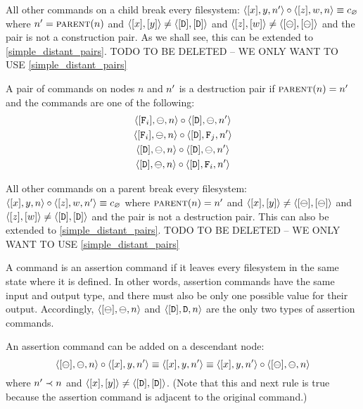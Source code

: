 \begin{myax}
All other commands on a child break every filesystem:
$\langle{[x],y,n'}\rangle\circ\langle{[z],w,n}\rangle \equiv c_\varnothing$ where $n'=\text{\normalfont\scshape{parent}}(n)$ and $\langle{[x],[y]}\rangle\neq\langle{[\mathtt{D}],[\mathtt{D}]}\rangle$ and $\langle{[z],[w]}\rangle\neq\langle{[\ominus],[\ominus]}\rangle$
and the pair is not a construction pair.
As we shall see, this can be extended to \cref{simple_distant_pairs}.
TODO TO BE DELETED -- WE ONLY WANT TO USE \cref{simple_distant_pairs}
\end{myax}

\begin{mydef}
A pair of commands on nodes $n$ and $n'$ is a destruction pair if $\text{\normalfont\scshape{parent}}(n)=n'$ and the commands are one
of the following:
   \begin{gather*}
            \langle{[\mathtt{F}_i],\ominus,n}\rangle\circ  \langle{[\mathtt{D}],\ominus,n'}\rangle \\
            \langle{[\mathtt{F}_i],\ominus,n}\rangle\circ  \langle{[\mathtt{D}],\mathtt{F}_j,n'}\rangle \\
            \langle{[\mathtt{D}],\ominus,n}\rangle\circ  \langle{[\mathtt{D}],\ominus,n'}\rangle \\
            \langle{[\mathtt{D}],\ominus,n}\rangle\circ  \langle{[\mathtt{D}],\mathtt{F}_i,n'}\rangle
   \end{gather*}
\end{mydef}

\begin{myax}
All other commands on a parent break every filesystem:
$\langle{[x],y,n}\rangle\circ\langle{[z],w,n'}\rangle \equiv c_\varnothing$ where $\text{\normalfont\scshape{parent}}(n)=n'$ and $\langle{[x],[y]}\rangle\neq\langle{[\ominus],[\ominus]}\rangle$ and $\langle{[z],[w]}\rangle\neq\langle{[\mathtt{D}],[\mathtt{D}]}\rangle$
and the pair is not a destruction pair.
This can also be extended to \cref{simple_distant_pairs}.
TODO TO BE DELETED -- WE ONLY WANT TO USE \cref{simple_distant_pairs}
\end{myax}

\begin{mydef}
A command is an assertion command if
it leaves every filesystem in the same state
where it is defined.
In other words, assertion commands have the same input and output type,
and there must also be only one possible value for their output.
Accordingly, $\langle{[\ominus],\ominus,n}\rangle$ and $\langle{[\mathtt{D}],\mathtt{D},n}\rangle$ are the only two types of assertion commands.
\end{mydef}

\begin{myax}
An assertion command can be added on a descendant node:
\[ \langle{[\ominus],\ominus,n}\rangle\circ\langle{[x],y,n'}\rangle \equiv \langle{[x],y,n'}\rangle \equiv \langle{[x],y,n'}\rangle\circ\langle{[\ominus],\ominus,n}\rangle \] 
where $n'\prec n$ and $\langle{[x],[y]}\rangle\neq\langle{[\mathtt{D}],[\mathtt{D}]}\rangle$.
(Note that this and next rule is true because the assertion command is
adjacent to the original command.)
\end{myax}

